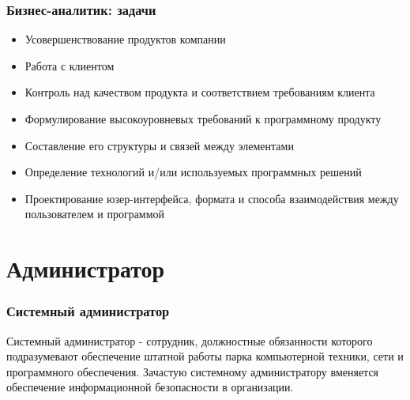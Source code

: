 \documentclass{../industrial-development}
\begin{document}
	\begin{frame} \frametitle{Бизнес-аналитик: задачи}
		\begin{itemize}
			\item Усовершенствование продуктов компании
			\item Работа с клиентом
			\item Контроль над качеством продукта и соответствием требованиям клиента
			\item Формулирование высокоуровневых требований к программному продукту
			\item Составление его структуры и связей между элементами
			\item Определение технологий и/или используемых программных решений
			\item Проектирование юзер-интерфейса, формата и способа взаимодействия между пользователем и программой
		\end{itemize}
	\end{frame}
	
	
	\section{Администратор} 
	
	\begin{frame} \frametitle{Системный администратор}
		\begin{block}{}
			\alert {Системный администратор} - сотрудник, должностные обязанности которого подразумевают обеспечение штатной работы парка компьютерной техники, сети и программного обеспечения. Зачастую системному администратору вменяется обеспечение информационной безопасности в организации.
		\end{block}
	\end{frame}
	
\end{document}
